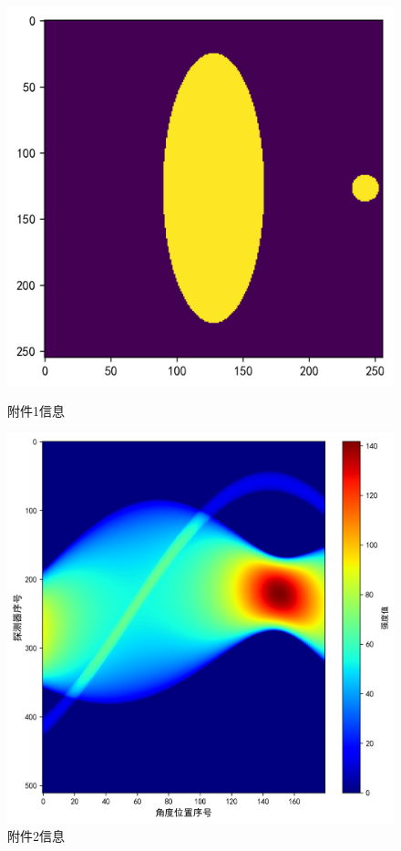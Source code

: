 \documentclass[12pt]{ctexart}
\begin{document}
	\begin{figure}[htbp]
		\centering
		\begin{minipage}[t]{0.45\textwidth}
			\centering
			\includegraphics[width=\textwidth]{附件1信息.png}
			\caption{附件1信息}
			\label{附件1}
		\end{minipage}
		\begin{minipage}[t]{0.45\textwidth}
			\centering
			\includegraphics[width=\textwidth]{附件2信息.png}
			\caption{附件2信息}
			\label{附件2}
		\end{minipage}
	\end{figure}
	
\end{document}
